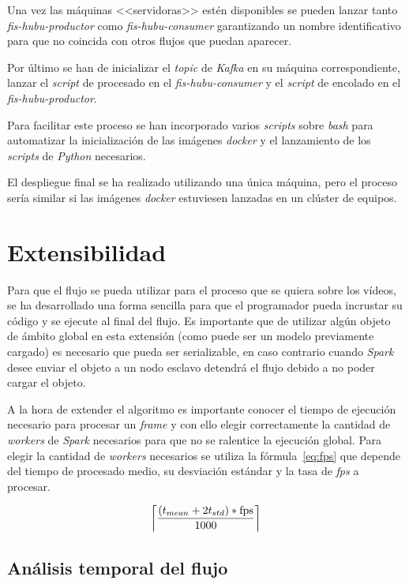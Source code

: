 Una vez las máquinas <<servidoras>> estén disponibles se pueden lanzar tanto \textit{fis-hubu-productor} como \textit{fis-hubu-consumer} garantizando un nombre identificativo para que no coincida con otros flujos que puedan aparecer.

Por último se han de inicializar el \textit{topic} de \textit{Kafka} en su máquina correspondiente, lanzar el \textit{script} de procesado en el \textit{fis-hubu-consumer} y el \textit{script} de encolado en el \textit{fis-hubu-productor}.

Para facilitar este proceso se han incorporado varios \textit{scripts} sobre \textit{bash} para automatizar la inicialización de las imágenes \textit{docker} y el lanzamiento de los \textit{scripts} de \textit{Python} necesarios.

El despliegue final se ha realizado utilizando una única máquina, pero el proceso sería similar si las imágenes \textit{docker} estuviesen lanzadas en un clúster de equipos.
  

\section{Extensibilidad}

Para que el flujo se pueda utilizar para el proceso que se quiera sobre los vídeos, se ha desarrollado una forma sencilla para que el programador pueda incrustar su código y se ejecute al final del flujo. Es importante que de utilizar algún objeto de ámbito global en esta extensión (como puede ser un modelo previamente cargado) es necesario que pueda ser serializable, en caso contrario cuando \textit{Spark} desee enviar el objeto a un nodo esclavo detendrá el flujo debido a no poder cargar el objeto.

A la hora de extender el algoritmo es importante conocer el tiempo de ejecución necesario para procesar un \textit{frame} y con ello elegir correctamente la cantidad de \textit{workers} de \textit{Spark} necesarios para que no se ralentice la ejecución global. Para elegir la cantidad de \textit{workers} necesarios se utiliza la fórmula~\ref{eq:fps} que depende del tiempo de procesado medio, su desviación estándar y la tasa de \textit{fps} a procesar.

\begin{equation}\label{eq:fps}
\left \lceil \frac{(t_{mean}+2t_{std})*\textrm{fps}}{1000} \right \rceil
\end{equation}

\subsection{Análisis temporal del flujo}\label{sec:analisistemporal_flujo}

